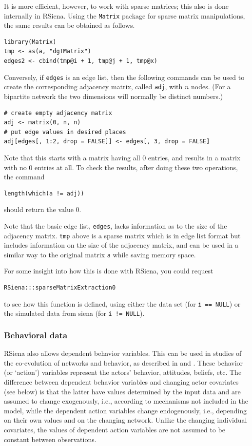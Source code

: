 \documentclass[a4paper,fleqn,11pt]{article}
\newcommand{\+}{\, + \,}
\newcommand{\sfn}[1]{\textsf{#1}}
\newcommand{\rs}{{\sf RSiena}}
\newcommand{\RS}{{\sf \textsf{RSiena} }}
\begin{document}
It is more efficient, however, to work with sparse matrices;
this also is done internally in \rs.
Using the \texttt{Matrix} package for sparse matrix manipulations,
the same results can be obtained as follows.
\begin{verbatim}
library(Matrix)
tmp <- as(a, "dgTMatrix")
edges2 <- cbind(tmp@i + 1, tmp@j + 1, tmp@x)
\end{verbatim}
Conversely, if \texttt{edges} is an edge list, then the following commands
can be used to create the corresponding
adjacency matrix, called \texttt{adj},
with $n$ nodes. (For a bipartite network the two dimensions
will normally be distinct numbers.)
\begin{verbatim}
# create empty adjacency matrix
adj <- matrix(0, n, n)
# put edge values in desired places
adj[edges[, 1:2, drop = FALSE]] <- edges[, 3, drop = FALSE]
\end{verbatim}
Note that this starts with a matrix having all 0 entries,
and results in a matrix with no 0 entries at all.
To check the results, after doing these two operations, the command
\begin{verbatim}
length(which(a != adj))
\end{verbatim}
should return the value 0.

Note that the basic edge list, \verb|edges|, lacks information as to the size of
the adjacency matrix. \verb|tmp| above is a sparse matrix which is in edge list
format but includes information on the size of the adjacency matrix, and can be
used in a similar way to the original matrix \verb|a| while saving memory space.

For some insight into how this is done with \rs, you could request
\begin{verbatim}
RSiena:::sparseMatrixExtraction0
\end{verbatim}
to see how this function is defined, using either the data set (for \texttt{i == NULL})
or the simulated data from \sfn{siena} (for \texttt{i != NULL}).


\subsubsection{Behavioral data}

\RS also allows dependent behavior variables. This can be used in studies
of the co-evolution of networks and behavior, as described
in \citet*{SnijdersEA07} and \citet*{SteglichEA10}.
These behavior (or `action') variables represent
the actors' behavior, attitudes, beliefs, etc.
The difference between dependent behavior variables and changing actor
covariates (see below) is that the latter
have values determined by the input data and are assumed to
change exogenously, i.e., according
to mechanisms not included in the model, while the dependent
action variables change endogenously, i.e.,
depending on their own values and on the changing network.
Unlike the changing individual covariates,
the values of dependent action variables are not assumed to be
constant between observations.
\end{document}
